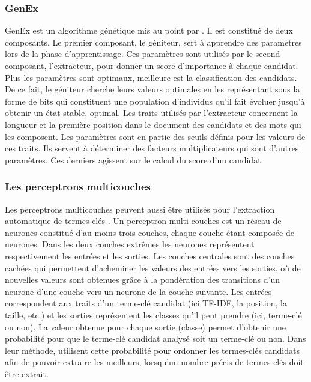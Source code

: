       \subsubsection{GenEx}
      \label{subsubsec:main-state_of_the_art-automatic_keyphrase_extraction-supervised_keyphrase_extraction-genex}
        GenEx est un algorithme génétique mis au point par
        . Il est constitué de deux
        composants. Le premier composant, le géniteur, sert à apprendre des
        paramètres lors de la phase d'apprentissage. Ces paramètres sont
        utilisés par le second composant, l'extracteur, pour donner un score
        d'importance à chaque candidat. Plus les paramètres sont optimaux,
        meilleure est la classification des candidats. De ce fait, le géniteur
        cherche leurs valeurs optimales en les représentant sous la forme de
        bits qui constituent une population d'individus qu'il fait évoluer
        jusqu'à obtenir un état stable, optimal. Les traits utilisés par
        l'extracteur concernent la longueur et la première position dans le
        document des candidats et des mots qui les composent. Les paramètres
        sont en partie des seuils définis pour les valeurs de ces traits. Ils
        servent à déterminer des facteurs multiplicateurs qui sont d'autres
        paramètres. Ces derniers agissent sur le calcul du score d'un candidat.

      \subsubsection{Les perceptrons multicouches}
      \label{subsubsec:main-state_of_the_art-automatic_keyphrase_extraction-supervised_keyphrase_extraction-neural_network}
        Les perceptrons multicouches peuvent aussi être utilisés pour l'extraction automatique de
        termes-clés \cite{sarkar2010neuralnetwork}. Un perceptron
        multi-couches est un réseau de neurones constitué d'au moins trois
        couches, chaque couche étant composée de neurones. Dans les deux
        couches extrêmes les neurones représentent respectivement les entrées
        et les sorties. Les couches centrales sont des couches cachées qui
        permettent d'acheminer les valeurs des entrées vers les sorties, où de
        nouvelles valeurs sont obtenues grâce à la pondération des transitions
        d'un neurone d'une couche vers un neurone de la couche suivante. Les
        entrées correspondent aux traits d'un terme-clé candidat (ici TF-IDF,
        la position, la taille, etc.) et les sorties représentent les classes
        qu'il peut prendre (ici, terme-clé ou non). La valeur obtenue pour
        chaque sortie (classe) permet d'obtenir une probabilité pour que le
        terme-clé candidat analysé soit un terme-clé ou non. Dans leur
        méthode,  utilisent cette probabilité
        pour ordonner les termes-clés candidats afin de pouvoir extraire les
        meilleurs, lorsqu'un nombre précis de termes-clés doit être extrait.

